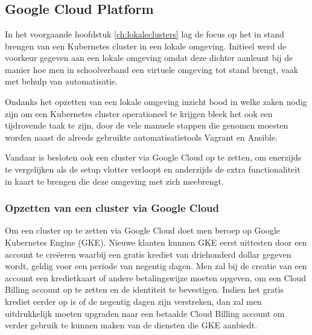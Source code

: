 
\chapter{}
\label{ch:cloudclusters}

\section{Google Cloud Platform}

In het voorgaande hoofdstuk \ref{ch:lokaleclusters} lag de focus op het in stand brengen van een Kubernetes cluster in een lokale omgeving. Initieel werd de voorkeur gegeven aan een lokale omgeving omdat deze dichter aanleunt bij de manier hoe men in schoolverband een virtuele omgeving tot stand brengt, vaak met behulp van automatisatie.

Ondanks het opzetten van een lokale omgeving inzicht bood in welke zaken nodig zijn om een Kubernetes cluster operationeel te krijgen bleek het ook een tijdrovende taak te zijn, door de vele manuele stappen die genomen moesten worden naast de alreeds gebruikte automatisatietools Vagrant en Ansible.

Vandaar is besloten ook een cluster via Google Cloud op te zetten, om enerzijds te vergelijken als de setup vlotter verloopt en anderzijds de extra functionaliteit in kaart te brengen die deze omgeving met zich meebrengt.

\subsection{Opzetten van een cluster via Google Cloud}

Om een cluster op te zetten via Google Cloud doet men beroep op Google Kubernetes Engine (GKE). Nieuwe klanten kunnen GKE eerst uittesten door een account te creëeren waarbij een gratis krediet van driehonderd dollar gegeven wordt, geldig voor een periode van negentig dagen. Men zal bij de creatie van een account een kredietkaart of andere betalingswijze moeten opgeven, om een Cloud Billing account op te zetten en de identiteit te bevestigen. Indien het gratis krediet eerder op is of de negentig dagen zijn verstreken, dan zal men uitdrukkelijk moeten upgraden naar een betaalde Cloud Billing account om verder gebruik te kunnen maken van de diensten die GKE aanbiedt. \autocite{GoogleCloud2022} 


